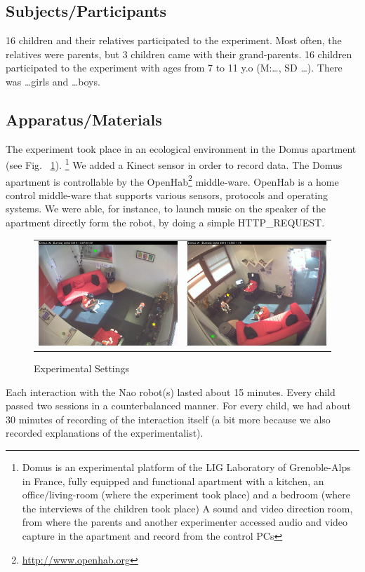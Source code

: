 \subsection{Subjects/Participants}
16 children and their relatives participated to the experiment. 
Most often, the relatives were parents, but 3 children came with their grand-parents.
16 children participated to the experiment with ages from 7 to 11 y.o (M:\dots, SD \dots).
There was \dots girls and \dots boys. 

\subsection{Apparatus/Materials}
The experiment took place in an ecological environment in the Domus apartment (see Fig. ~\ref{fig:domusroof}).
\footnote{Domus is an experimental platform of the LIG Laboratory of Grenoble-Alps in France, fully equipped and functional apartment with a kitchen, an office/living-room (where the experiment took place) and  a bedroom (where the interviews of the children took place)
	A sound and video direction room, from where the parents and another experimenter accessed audio and video capture in the apartment and record from the control PCs}
We added a Kinect sensor in order to record data. 
The Domus apartment is controllable by the OpenHab\footnote{\url{http://www.openhab.org}} middle-ware. 
OpenHab is a home control middle-ware that supports various sensors, protocols and operating systems. 
We were able, for instance, to launch music on the speaker of the apartment directly form the robot, by doing a simple HTTP\_REQUEST. 
\begin{figure}[h]
	\begin{tabular}{c c}
		\includegraphics[width=0.45\linewidth]{Figures/illustrate/roof1}&
		\includegraphics[width=0.45\linewidth]{Figures/illustrate/roof2}
	\end{tabular}
	\caption{Experimental Settings}
	\label{fig:domusroof}
\end{figure}
Each interaction with the Nao robot(s) lasted about 15 minutes. 
Every child passed two sessions in a counterbalanced manner. 
For every child, we had about 30 minutes of recording of the interaction itself (a bit more because we also recorded explanations of the experimentalist). 
 

